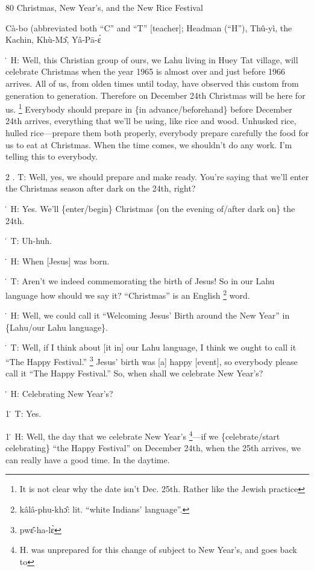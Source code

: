 
80 Christmas, New Year's, and the New Rice Festival

Cà-bo (abbreviated both ``C'' and ``T'' [teacher]; Headman (``H''), Thû-yì,
the Kachin, Khù-Mɔ̂, Yâ-Pā-ɛ́

\. H: Well, this Christian group of ours, we Lahu living in Huey Tat village, will
celebrate Christmas when the year 1965 is almost over and just before 1966 arrives.
All of us, from olden times until today, have observed this custom from generation
to generation.  Therefore on December 24th Christmas will be here for us. \footnote{It is not clear why the date isn't Dec. 25th.  Rather like the Jewish practice} Everybody
should prepare in \{in advance/beforehand\} before December 24th arrives, everything
that we'll be using, like rice and wood.  Unhusked rice, hulled rice---prepare
them both properly, everybody prepare carefully the food for us to eat at Christmas.
When the time comes, we shouldn't do any work.  I'm telling this to everybody.

2 . T: Well, yes, we should prepare and make ready.  You're saying that we'll enter
the Christmas season after dark on the 24th, right?

\. H: Yes.  We'll \{enter/begin\} Christmas \{on the evening of/after dark on\}
the 24th.

\. T: Uh-huh.

\. H: When [Jesus] was born.

\. T: Aren't we indeed commemorating the birth of Jesus!  So in our Lahu language
how should we say it?  ``Christmas'' is an English \footnote{kâlâ-phu-khɔ̂: lit. ``white Indians' language''.} word.

\. H: Well, we could call it ``Welcoming Jesus' Birth around the New Year'' in
\{Lahu/our Lahu language\}.

\. T: Well, if I think about [it in] our Lahu language, I think we ought to call
it ``The Happy Festival.'' \footnote{pwɛ̂-ha-lɛ̀}  Jesus' birth was [a] happy [event], so everybody
please call it ``The Happy Festival.''  So, when shall we celebrate New Year's?

\. H: Celebrating New Year's?

1\. T: Yes.

1\. H: Well, the day that we celebrate New Year's \footnote{H. was unprepared for this change of subject to New Year's, and goes back to}---if we \{celebrate/start
celebrating\} ``the Happy Festival'' on December 24th, when the 25th arrives, we
can really have a good time.  In the daytime.

